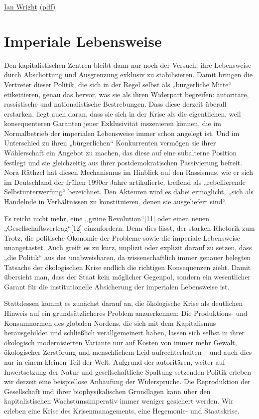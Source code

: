 \documentclass[
]{book}
\begin{document}
\href{https://ianwrightsite.wordpress.com/2017/11/16/the-social-architecture-of-capitalism/}{Ian Wright}
\href{pdf/Ian_Wright_2005-Social_Architecture_of_Capitalism.pdf}{(pdf)}

\hypertarget{imperiale-lebensweise}{%
\section{Imperiale Lebensweise}\label{imperiale-lebensweise}}

Den kapitalistischen Zentren bleibt dann nur noch der Versuch, ihre Lebensweise durch Abschottung und Ausgrenzung exklusiv zu stabilisieren. Damit bringen die Vertreter dieser Politik, die sich in der Regel selbst als „bürgerliche Mitte`` etikettieren, genau das hervor, was sie als ihren Widerpart begreifen: autoritäre, rassistische und nationalistische Bestrebungen. Dass diese derzeit überall erstarken, liegt auch daran, dass sie sich in der Krise als die eigentlichen, weil konsequenteren Garanten jener Exklusivität inszenieren können, die im Normalbetrieb der imperialen Lebensweise immer schon angelegt ist. Und im Unterschied zu ihren „bürgerlichen`` Konkurrenten vermögen sie ihrer Wählerschaft ein Angebot zu machen, das diese auf eine subalterne Position festlegt und sie gleichzeitig aus ihrer postdemokratischen Passivierung befreit. Nora Räthzel hat diesen Mechanismus im Hinblick auf den Rassismus, wie er sich im Deutschland der frühen 1990er Jahre artikulierte, treffend als „rebellierende Selbstunterwerfung`` bezeichnet. Den Akteuren wird es dabei ermöglicht, „sich als Handelnde in Verhältnissen zu konstituieren, denen sie ausgeliefert sind``.

Es reicht nicht mehr, eine „grüne Revolution``{[}11{]} oder einen neuen „Gesellschaftsvertrag``{[}12{]} einzufordern. Denn dies lässt, der starken Rhetorik zum Trotz, die politische Ökonomie der Probleme sowie die imperiale Lebensweise unangetastet. Auch greift es zu kurz, implizit oder explizit darauf zu setzen, dass „die Politik`` aus der unabweisbaren, da wissenschaftlich immer genauer belegten Tatsache der ökologischen Krise endlich die richtigen Konsequenzen zieht. Damit übersieht man, dass der Staat kein möglicher Gegenpol, sondern ein wesentlicher Garant für die institutionelle Absicherung der imperialen Lebensweise ist.

Stattdessen kommt es zunächst darauf an, die ökologische Krise als deutlichen Hinweis auf ein grundsätzlicheres Problem anzuerkennen: Die Produktions- und Konsumnormen des globalen Nordens, die sich mit dem Kapitalismus herausgebildet und schließlich verallgemeinert haben, lassen sich selbst in ihrer ökologisch modernisierten Variante nur auf Kosten von immer mehr Gewalt, ökologischer Zerstörung und menschlichem Leid aufrechterhalten -- und auch dies nur in einem kleinen Teil der Welt. Aufgrund der autoritären, weiter auf Inwertsetzung der Natur und gesellschaftliche Spaltung setzenden Politik erleben wir derzeit eine beispiellose Anhäufung der Widersprüche. Die Reproduktion der Gesellschaft und ihrer biophysikalischen Grundlagen kann über den kapitalistischen Wachstumsimperativ immer weniger gesichert werden. Wir erleben eine Krise des Krisenmanagements, eine Hegemonie- und Staatskrise.
\end{document}
